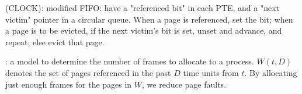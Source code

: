 \documentclass[fontsize=9pt]{slnotes}
\begin{document}
 (CLOCK): modified FIFO: have a "referenced bit" in each PTE, and a "next victim" pointer in a circular queue. When a page is referenced, set the bit; when a page is to be evicted, if the next victim's bit is set, unset and advance, and repeat; else evict that page.

: a model to determine the number of frames to allocate to a process. \(W(t, D)\) denotes the set of pages referenced in the past \(D\) time units from \(t\). By allocating just enough frames for the pages in \(W\), we reduce page faults.
\end{document}
